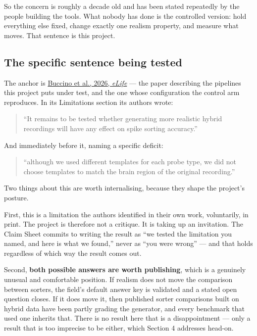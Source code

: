 \documentclass[12pt]{article}
\begin{document}
So the concern is roughly a decade old and has been stated repeatedly by the people building
the tools. What nobody has done is the controlled version: hold everything else fixed, change
exactly one realism property, and measure what moves. That sentence is this project.

\subsection{The specific sentence being tested}

The anchor is \href{https://doi.org/10.7554/eLife.110170.3}{Buccino et al., 2026,
\emph{eLife}} --- the paper describing the pipelines this project puts under test, and the
one whose configuration the control arm reproduces. In its Limitations section its authors
wrote:

\begin{quote}
``It remains to be tested whether generating more realistic hybrid recordings will have any
effect on spike sorting accuracy.''
\end{quote}

And immediately before it, naming a specific deficit:

\begin{quote}
``although we used different templates for each probe type, we did not choose templates to
match the brain region of the original recording.''
\end{quote}

Two things about this are worth internalising, because they shape the project's posture.

First, this is a limitation the authors identified in their own work, voluntarily, in print.
The project is therefore not a critique. It is taking up an invitation. The Claim Sheet
commits to writing the result as ``we tested the limitation you named, and here is what we
found,'' never as ``you were wrong'' --- and that holds regardless of which way the result
comes out.

Second, \textbf{both possible answers are worth publishing}, which is a genuinely unusual
and comfortable position. If realism does not move the comparison between sorters, the
field's default answer key is validated and a stated open question closes. If it does move
it, then published sorter comparisons built on hybrid data have been partly grading the
generator, and every benchmark that used one inherits that. There is no result here that is
a disappointment --- only a result that is too imprecise to be either, which Section 4
addresses head-on.
\end{document}
